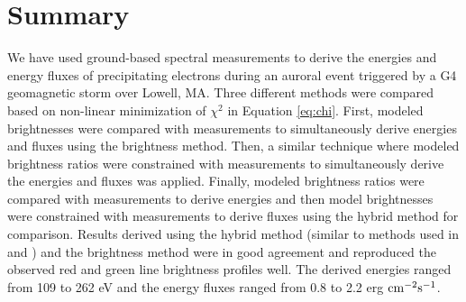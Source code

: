 \documentclass[crop=false,class=mitthesis,oneside,font=12pt]{standalone}
\begin{document}
\section{Summary}
We have used ground-based spectral measurements to derive the energies and energy fluxes of precipitating electrons during an auroral event triggered by a G4 geomagnetic storm over Lowell, MA. Three different methods were compared based on non-linear minimization of $\chi^2$ in Equation \ref{eq:chi}. First, modeled brightnesses were compared with measurements to simultaneously derive energies and fluxes using the brightness method. Then, a similar technique where modeled brightness ratios were constrained with measurements to simultaneously derive the energies and fluxes was applied. Finally, modeled brightness ratios were compared with measurements to derive energies and then model brightnesses were constrained with measurements to derive fluxes using the hybrid method for comparison.  
Results derived using the hybrid method (similar to methods used in \cite{rees_1974} and \cite{pallamraju_2011}) and the brightness method were in good agreement and reproduced the observed red and green line brightness profiles well. The derived energies ranged from 109 to 262 eV and the  energy fluxes ranged from 0.8 to 2.2 erg $\rm cm^{-2} s^{-1}$.
\end{document}
